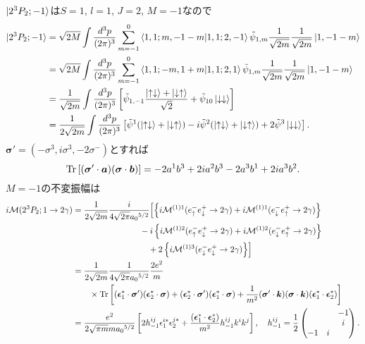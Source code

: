$\ket{2^3P_2;-1}$は$S=1$, $l=1$, $J=2$, $M=-1$なので
\begin{align*}
  \ket{2^3P_2;-1} &= \sqrt{2M} \int \frac{d^3p}{(2\pi)^3} \sum_{m=-1}^0
  \braket{1,1; m,-1-m | 1,1; 2, -1} \tilde{\psi}_{1,m} \frac{1}{\sqrt{2m}}\frac{1}{\sqrt{2m}} \ket{1, -1-m} \\
  &= \sqrt{2M} \int \frac{d^3p}{(2\pi)^3} \sum_{m=-1}^0
  \braket{1,1; -m,1+m | 1,1; 2, 1} \tilde{\psi}_{1,m} \frac{1}{\sqrt{2m}}\frac{1}{\sqrt{2m}} \ket{1, -1-m} \\
  &= \frac{1}{\sqrt{2m}} \int \frac{d^3p}{(2\pi)^3} \left[ \tilde{\psi}_{1, -1} \frac{\ket{\uparrow\downarrow} + \ket{\downarrow\uparrow}}{\sqrt{2}}
  + \tilde{\psi}_{10} \ket{\downarrow\downarrow} \right] \\
  &= \frac{1}{2\sqrt{2m}} \int \frac{d^3p}{(2\pi)^3} \left[ \tilde\psi^1 (\ket{\uparrow\downarrow} + \ket{\downarrow\uparrow})
  - i\tilde\psi^2 (\ket{\uparrow\downarrow} + \ket{\downarrow\uparrow}) + 2 \tilde\psi^3 \ket{\downarrow\downarrow} \right] .
\end{align*}
$\boldsymbol\sigma' = (-\sigma^3, i\sigma^3, -2\sigma^-)$とすれば
\[ \operatorname{Tr} \left[ (\boldsymbol\sigma' \cdot \boldsymbol{a}) (\boldsymbol\sigma \cdot \boldsymbol{b}) \right] = - 2a^1b^3 + 2i a^2b^3 - 2a^3b^1 + 2i a^3b^2 . \]
$M=-1$の不変振幅は
\begin{align*}
  i\mathcal{M}(2^3P_2;1 \to 2\gamma) &= \frac{1}{2\sqrt{2m}} \frac{i}{4\sqrt{2\pi} a_0{}^{5/2}}
  \Bigl[ \left\{ i\mathcal{M}^{(1)1}(e^-_\uparrow e^+_\downarrow \to 2\gamma) + i\mathcal{M}^{(1)1}(e^-_\downarrow e^+_\uparrow \to 2\gamma) \right\} \\
  &\qquad\qquad\qquad\qquad - i \left\{ i\mathcal{M}^{(1)2}(e^-_\uparrow e^+_\downarrow \to 2\gamma) + i\mathcal{M}^{(1)2}(e^-_\downarrow e^+_\uparrow \to 2\gamma) \right\} \\
  &\qquad\qquad\qquad\qquad\quad + 2 \left\{ i\mathcal{M}^{(1)3}(e^-_\downarrow e^+_\downarrow \to 2\gamma) \right\} \Bigr] \\
  &= \frac{1}{2\sqrt{2m}} \frac{1}{4\sqrt{2\pi} a_0{}^{5/2}} \frac{2e^2}{m} \\
  & \qquad \times \operatorname{Tr} \left[ (\boldsymbol{\epsilon}_1^\ast \cdot \boldsymbol\sigma') (\boldsymbol{\epsilon}_2^\ast \cdot \boldsymbol\sigma)
  + (\boldsymbol{\epsilon}_2^\ast \cdot \boldsymbol\sigma')(\boldsymbol{\epsilon}_1^\ast \cdot \boldsymbol\sigma)
  + \frac{1}{m^2} (\boldsymbol\sigma' \cdot \boldsymbol{k})(\boldsymbol\sigma \cdot \boldsymbol{k})(\boldsymbol{\epsilon}_1^\ast \cdot \boldsymbol{\epsilon}_2^\ast) \right] \\
  &= \frac{e^2}{2\sqrt{\pi m}m a_0{}^{5/2}} \left[ 2h_{-1}^{ij} \epsilon_1^{i\ast} \epsilon_2^{j\ast}
  + \frac{(\boldsymbol{\epsilon}_1^\ast \cdot \boldsymbol{\epsilon}_2^\ast)}{m^2} h_{-1}^{ij} k^ik^j \right] , \quad
  h_{-1}^{ij} = \frac{1}{2}
  \begin{pmatrix}
    & & -1 \\
    & & i \\
    -1 & i &
  \end{pmatrix}
  .
\end{align*}

